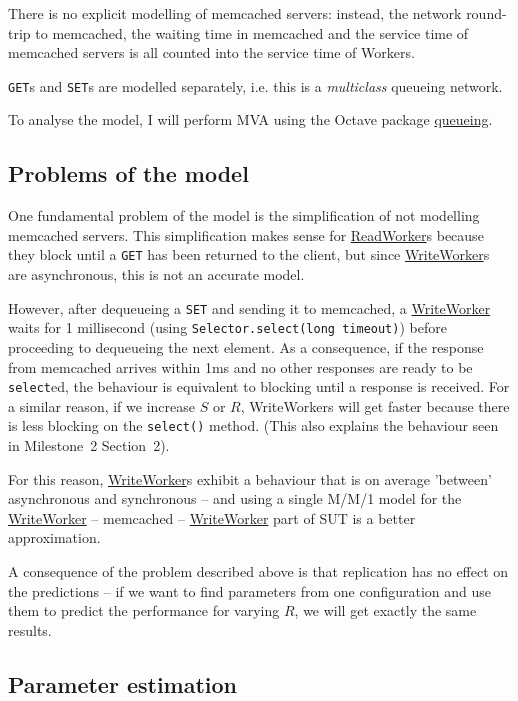 \documentclass[11pt]{article}
\newcommand{\get}[0]{\texttt{GET}}
\newcommand{\set}[0]{\texttt{SET}}
\newcommand{\linkmain}[1]{\href{https://gitlab.inf.ethz.ch/pungast/asl-fall16-project/blob/master/src/main/java/asl/#1.java}{#1}}
\begin{document}
There is no explicit modelling of memcached servers: instead, the network round-trip to memcached, the waiting time in memcached and the service time of memcached servers is all counted into the service time of Workers.

\get{}s and \set{}s are modelled separately, i.e. this is a \emph{multiclass} queueing network.

To analyse the model, I will perform MVA using the Octave package \href{http://www.moreno.marzolla.name/software/queueing/queueing.html}{queueing}.

\subsection{Problems of the model}
\label{sec:part3:problems}

One fundamental problem of the model is the simplification of not modelling memcached servers. This simplification makes sense for \linkmain{ReadWorker}s because they block until a \get{} has been returned to the client, but since \linkmain{WriteWorker}s are asynchronous, this is not an accurate model.

However, after dequeueing a \set{} and sending it to memcached, a \linkmain{WriteWorker} waits for 1 millisecond (using \texttt{Selector.select(long timeout)}) before proceeding to dequeueing the next element. As a consequence, if the response from memcached arrives within 1ms and no other responses are ready to be \texttt{select}ed, the behaviour is equivalent to blocking until a response is received. For a similar reason, if we increase $S$ or $R$, WriteWorkers will get faster because there is less blocking on the \texttt{select()} method. (This also explains the behaviour seen in Milestone~2 Section~2).

For this reason, \linkmain{WriteWorker}s exhibit a behaviour that is on average 'between' asynchronous and synchronous -- and using a single M/M/1 model for the \linkmain{WriteWorker} -- memcached -- \linkmain{WriteWorker} part of SUT is a better approximation.

A consequence of the problem described above is that replication has no effect on the predictions -- if we want to find parameters from one configuration and use them to predict the performance for varying $R$, we will get exactly the same results.


\subsection{Parameter estimation}
\end{document}
